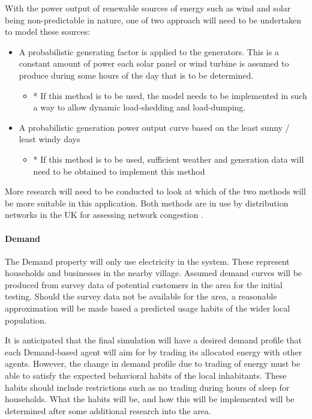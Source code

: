 With the power output of renewable sources of energy such as wind and solar being non-predictable in nature, one of two approach will need to be undertaken to model these sources:
\begin{itemize}
  \item A probabilistic generating factor is applied to the generators. This is a constant amount of power each solar panel or wind turbine is assumed to produce during some hours of the day that is to be determined. 
  
  \begin{itemize}
    \item * If this method is to be used, the model needs to be implemented in such a way to allow dynamic load-shedding and load-dumping.  
  \end{itemize}
  
  \item A probabilistic generation power output curve based on the least sunny / least windy days
  \begin{itemize}
    \item * If this method is to be used, sufficient weather and generation data will need to be obtained to implement this method
  \end{itemize}
\end{itemize}

More research will need to be conducted to look at which of the two methods will be more suitable in this application. Both methods are in use by distribution networks in the UK for assessing network congestion \cite{IPSA-web-constraint:2015}.

\paragraph{Demand}
The Demand property will only use electricity in the system. These represent households and businesses in the nearby village. Assumed demand curves will be produced from survey data of potential customers in the area for the initial testing. Should the survey data not be available for the area, a reasonable approximation will be made based a predicted usage habits of the wider local population.

It is anticipated that the final simulation will have a desired demand profile that each Demand-based agent will aim for by trading its allocated energy with other agents. However, the change in demand profile due to trading of energy must be able to satisfy the expected behavioral habits of the local inhabitants. These habits should include restrictions such as no trading during hours of sleep for households. What the habits will be, and how this will be implemented will be determined after some additional research into the area.

